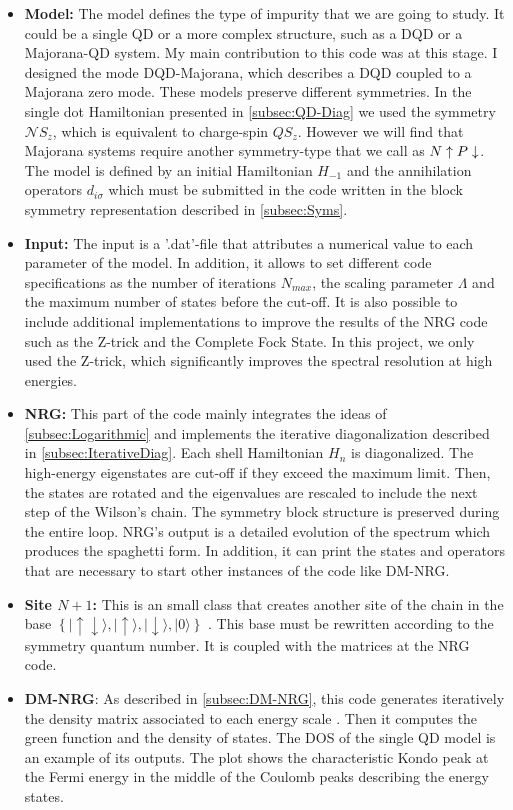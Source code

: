 \begin{itemize}
\item \textbf{Model:} The model defines the type of impurity that we are going to study. It could be a single QD or a more complex structure, such as a DQD or a Majorana-QD system. My main contribution to this code was at this stage. I designed the mode DQD-Majorana, which describes a DQD coupled to a Majorana zero mode. These models preserve different symmetries. In the single dot Hamiltonian presented in \ref{subsec:QD-Diag} we used the symmetry $\mathcal{N}S_z$, which is equivalent to charge-spin $QS_z$. However we will find that Majorana systems  require another  symmetry-type that we call as $N\uparrow P\downarrow$. The model is defined by an initial Hamiltonian $H_{-1}$ and the annihilation operators $d_{i\sigma}$ which must be submitted in the code written in the block symmetry representation described in \ref{subsec:Syms}.
\item \textbf{Input:} The input is a '.dat'-file that attributes a numerical value to each parameter of the model. In addition, it allows to set different code specifications as the number of iterations $N_{max}$, the scaling parameter $\Lambda$ and the maximum number of states before the cut-off. It is also possible to include additional implementations to improve the results of the NRG code such as the Z-trick \cite{oliveira_generalized_1994} and the Complete Fock State. In this project, we only used the Z-trick, which significantly improves the spectral resolution at high energies.
\item \textbf{NRG:} This part of the code mainly integrates the ideas of \ref{subsec:Logarithmic} and implements the iterative diagonalization described in \ref{subsec:IterativeDiag}. Each shell Hamiltonian $H_n$ is diagonalized. The high-energy eigenstates are cut-off if they exceed the maximum limit. Then, the states are rotated and the eigenvalues are rescaled to include the next step of the Wilson's chain. The symmetry block structure is preserved during the entire loop. NRG's output is a detailed evolution of the spectrum which produces the spaghetti form. In addition, it can print the states and operators that are necessary to start other instances of the code like DM-NRG.
\item \textbf{Site $N+1$:} This is an small class that creates another site of the chain in the base $\left\{ \vert\uparrow\!\downarrow\rangle,\vert\uparrow\rangle,\vert\downarrow\rangle,\vert0\rangle\right\} $ . This base must be rewritten according to the symmetry quantum number. It is coupled with the matrices at the NRG code. 
\item \textbf{DM-NRG}: As described in \ref{subsec:DM-NRG}, this code generates iteratively the density matrix associated to each energy scale . Then it computes the green function and the density of states. The DOS of the single QD model is an example of its outputs. The plot shows the characteristic Kondo peak at the Fermi energy in the middle of the Coulomb peaks describing the energy states. 
\end{itemize}

